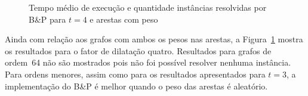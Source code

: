 \begin{figure}%
    \centering
    \caption{Tempo médio de execução e quantidade instâncias resolvidas por B\&P para $t = 4$ e arestas com peso}%
    \label{fig:time_inst_den-sf4-random_euclidean}%
\end{figure}

Ainda com relação aos grafos com ambos os pesos nas arestas, a
Figura~\ref{fig:time_inst_den-sf4-random_euclidean} mostra os
resultados para o fator de dilatação quatro. Resultados para grafos de
ordem~64 não são mostrados pois não foi possível resolver nenhuma
instância. Para ordens menores, assim como para os resultados
apresentados para $t = 3$, a implementação do B\&P é melhor quando o peso das
arestas é aleatório.


